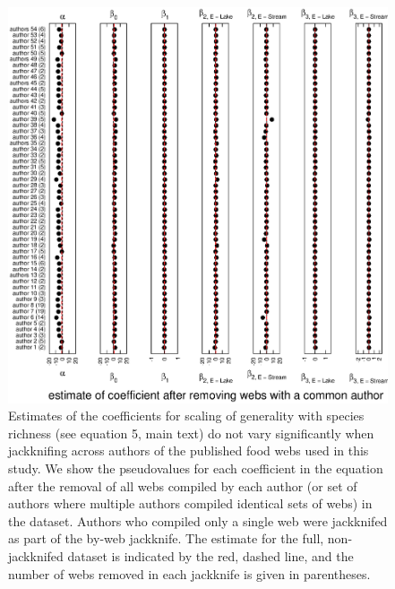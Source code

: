 \documentclass[12pt]{article}
\begin{document}
  \newpage

    \begin{figure}[!h]
    \centerline{\includegraphics*[height=.75\textheight]{Figures/Jackknife/Gen_author.eps}}
    \caption{Estimates of the coefficients for scaling of generality with species richness
    (see equation 5, main text) do not vary significantly
    when jackknifing across authors of the published food webs used in this study. 
    We show the pseudovalues for each coefficient
    in the equation after the removal of all webs compiled by each author (or set of authors where
    multiple authors compiled identical sets of webs) in the dataset. Authors
    who compiled only a single web were jackknifed as part of the by-web jackknife.
    The estimate for the full, non-jackknifed dataset is indicated by the red, dashed line, and
    the number of webs removed in each jackknife is given in parentheses.}
    \label{Gen_auth}
    \end{figure}

  \newpage
\end{document}
